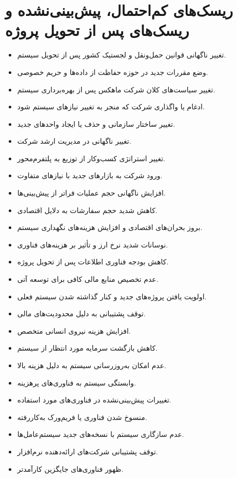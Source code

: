 \documentclass[12pt,a4paper]{report}
\begin{document}
\section{ریسک‌های کم‌احتمال، پیش‌بینی‌نشده و ریسک‌های پس از تحویل پروژه}
\begin{itemize}
\item
تغییر ناگهانی قوانین حمل‌ونقل و لجستیک کشور پس از تحویل سیستم.
\item
وضع مقررات جدید در حوزه حفاظت از داده‌ها و حریم خصوصی.
\item
تغییر سیاست‌های کلان شرکت ماهکس پس از بهره‌برداری سیستم.
\item
ادغام یا واگذاری شرکت که منجر به تغییر نیازهای سیستم شود.
\item
تغییر ساختار سازمانی و حذف یا ایجاد واحدهای جدید.
\item
تغییر ناگهانی در مدیریت ارشد شرکت.
\item
تغییر استراتژی کسب‌وکار از توزیع به پلتفرم‌محور.
\item
ورود شرکت به بازارهای جدید با نیازهای متفاوت.
\item
افزایش ناگهانی حجم عملیات فراتر از پیش‌بینی‌ها.
\item
کاهش شدید حجم سفارشات به دلایل اقتصادی.
\item
بروز بحران‌های اقتصادی و افزایش هزینه‌های نگهداری سیستم.
\item
نوسانات شدید نرخ ارز و تأثیر بر هزینه‌های فناوری.
\item
کاهش بودجه فناوری اطلاعات پس از تحویل پروژه.
\item
عدم تخصیص منابع مالی کافی برای توسعه آتی.
\item
اولویت یافتن پروژه‌های جدید و کنار گذاشته شدن سیستم فعلی.
\item
توقف پشتیبانی به دلیل محدودیت‌های مالی.
\item
افزایش هزینه نیروی انسانی متخصص.
\item
کاهش بازگشت سرمایه مورد انتظار از سیستم.
\item
عدم امکان به‌روزرسانی سیستم به دلیل هزینه بالا.
\item
وابستگی سیستم به فناوری‌های پرهزینه.
\item
تغییرات پیش‌بینی‌نشده در فناوری‌های مورد استفاده.
\item
منسوخ شدن فناوری یا فریم‌ورک به‌کاررفته.
\item
عدم سازگاری سیستم با نسخه‌های جدید سیستم‌عامل‌ها.
\item
توقف پشتیبانی شرکت‌های ارائه‌دهنده نرم‌افزار.
\item
ظهور فناوری‌های جایگزین کارآمدتر.

\end{itemize}
\end{document}
